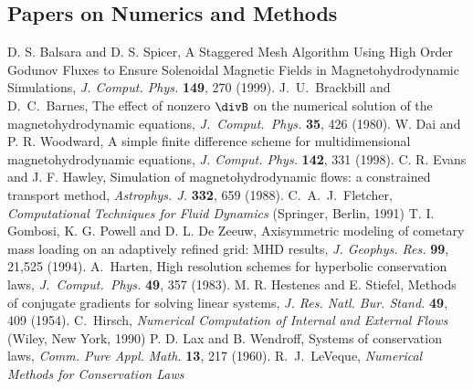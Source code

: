 \renewcommand{\bibname}{References}
\begin{thebibliography}{33}


\section*{Papers on Numerics and Methods}

    D. S. Balsara and D. S. Spicer,
    A Staggered Mesh Algorithm Using High Order Godunov Fluxes to Ensure
	   Solenoidal Magnetic Fields in Magnetohydrodynamic Simulations,
    {\it J. Comput. Phys.} {\bf 149}, 270 (1999).
    J.\ U.\ Brackbill and D.\ C.\ Barnes,
    The effect of nonzero $\divB$ on the numerical solution 
    of the magnetohydrodynamic equations,
    {\it J.\ Comput.\ Phys.} {\bf 35}, 426 (1980).
    W. Dai and P. R. Woodward,
    A simple finite difference scheme for multidimensional
	   magnetohydrodynamic equations,
    {\it J. Comput. Phys.} {\bf 142}, 331 (1998).
 C. R. Evans and J. F. Hawley,
   Simulation of magnetohydrodynamic flows:
	  a constrained transport method,
   {\it Astrophys. J.} {\bf 332}, 659 (1988).
    C.\ A.\ J.\ Fletcher, 
    {\it Computational Techniques for Fluid Dynamics}
    (Springer, Berlin, 1991)
    T. I. Gombosi, K. G. Powell and D. L. De Zeeuw, 
    Axisymmetric modeling of cometary mass loading on an adaptively
    refined grid: MHD results,
    {\it J. Geophys. Res.} {\bf 99}, 21,525 (1994).
    A.\ Harten,
    High resolution schemes for hyperbolic conservation laws,
    {\it J.\ Comput.\ Phys.} {\bf 49}, 357 (1983).
    M. R. Hestenes and E. Stiefel,
    Methods of conjugate gradients for solving linear systems,
    {\it J. Res. Natl. Bur. Stand.} {\bf 49}, 409 (1954).
    C.\ Hirsch,
    {\it Numerical Computation of Internal and External Flows}
    (Wiley, New York, 1990)
    P. D. Lax and B. Wendroff,
    Systems of conservation laws,
    {\it Comm. Pure Appl. Math.} {\bf 13}, 217 (1960).
    R.\ J.\ LeVeque,
    {\it Numerical Methods for Conservation Laws}

\end{thebibliography}

